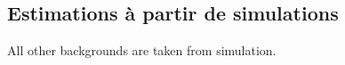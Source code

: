 \subsection{Estimations à partir de simulations}\label{chapter-HTT_analysis-section-bg_estimation-MC}

All other backgrounds are taken from simulation.
